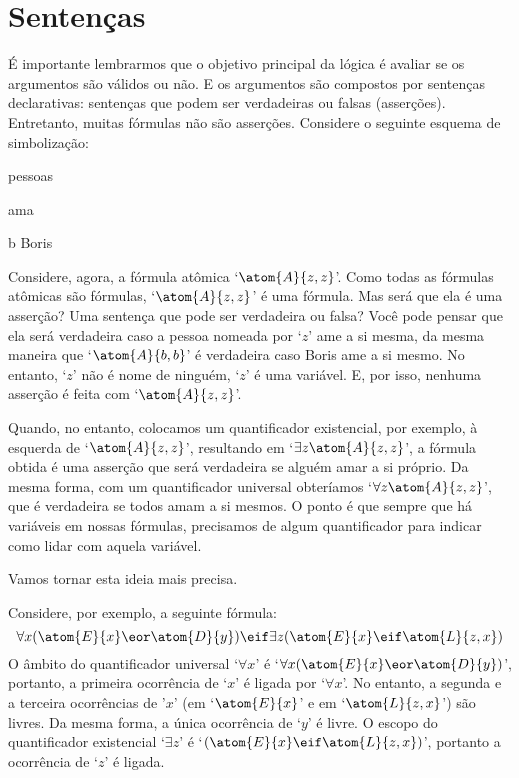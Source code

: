 \section{Sentenças}
É importante lembrarmos que o objetivo principal da lógica é avaliar se os argumentos são válidos ou não.
E os argumentos são compostos por sentenças declarativas:
sentenças que podem ser verdadeiras ou falsas (asserções).
Entretanto, muitas fórmulas não são asserções.
Considere o seguinte esquema de simbolização:
\begin{center}
	\begin{ekey}
		\item[\text{domínio}] pessoas
		\item[\atom{A}{x,y}]  ama 
		\item[b] Boris
	\end{ekey}
\end{center}
Considere, agora, a fórmula atômica `$\atom{A}{z,z}$'.
Como todas as fórmulas atômicas são fórmulas, `$\atom{A}{z,z}$' é uma fórmula. Mas será que ela é uma asserção? Uma sentença que pode ser verdadeira ou falsa?
Você pode pensar que ela será verdadeira caso a pessoa nomeada por `$z$' ame a si mesma, da mesma maneira que `$\atom{A}{b,b}$' é verdadeira caso Boris ame a si mesmo.
No entanto, `$z$' não é nome de ninguém, `$z$' é uma variável.
E, por isso, nenhuma asserção é feita com `$\atom{A}{z,z}$'.

Quando, no entanto, colocamos um quantificador existencial, por exemplo, à esquerda de `$\atom{A}{z,z}$', resultando em `$\exists z \atom{A}{z,z}$', a fórmula obtida é uma asserção  que será verdadeira se alguém amar a si próprio.
Da mesma forma, com um quantificador universal obteríamos `$\forall z \atom{A}{z,z}$', que é verdadeira se todos amam a si mesmos.
O ponto é que sempre que há variáveis em nossas fórmulas, precisamos de algum quantificador para indicar como lidar com aquela variável.

Vamos tornar esta ideia mais precisa.
        
Considere, por exemplo, a seguinte fórmula:
	$$\forall x(\atom{E}{x} \eor \atom{D}{y}) \eif \exists z(\atom{E}{x} \eif \atom{L}{z,x})$$
O âmbito do quantificador universal `$\forall x$' é `$\forall x (\atom{E}{x} \eor \atom{D}{y})$', portanto, a primeira ocorrência de `$x$' é ligada por `$\forall x$'.
No entanto, a segunda e a terceira ocorrências de '$x$' (em `$\atom{E}{x}$' e em `$\atom{L}{z,x}$') são livres.
Da mesma forma, a única ocorrência de `$y$' é livre.
O escopo do quantificador existencial `$\exists z$' é `$(\atom{E}{x} \eif \atom{L}{z,x})$', portanto a ocorrência de `$z$' é ligada.

